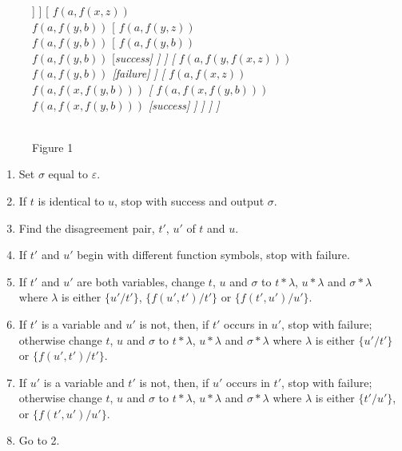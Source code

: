 \documentclass[letterpaper]{report}
\begin{document}
\begin{figure}[h]
\begin{forest}
[
	{$f(x, z)$\\ $f(a, f(y, b))$}
	[
		{$f(a, z)$\\ $f(a, f(y, b))$}
		[
			{$f(a, f(y, b))$\\ $f(a, f(y, b))$}
			[\it success]
		]
	]
	[
		{$f(a, f(x, z))$\\ $f(a, f(y, b))$}
		[
			{$f(a, f(y, z))$\\ $f(a, f(y, b))$}
			[
				{$f(a, f(y, b))$\\ $f(a, f(y, b))$}
				[\it success]
			]
		]
		[
			{$f(a, f(y, f(x, z)))$\\ $f(a, f(y, b))$}
			[\it failure]
		]
		[
			{$f(a, f(x, z))$\\ $f(a, f(x, f(y, b)))$}
			[
				{$f(a, f(x, f(y, b)))$\\ $f(a, f(x, f(y, b)))$}
				[\it success]
			]
		]
	]
]
\end{forest}\\
\small Figure 1
\end{figure}


\begin{enumerate}
	\def\labelenumi{(\arabic{enumi})}
	\item
	Set $\sigma$ equal to $\varepsilon$.
	\item
	If $t$ is identical to $u$, stop with success and output
	$\sigma$.
	\item
	Find the disagreement pair, $t'$, $u'$ of $t$
	and $u$.
	\item
	If $t'$ and $u'$ begin with different function
	symbols, stop with failure.
	\item
	If $t'$ and $u'$ are both variables, change $t$,
	$u$ and $\sigma$ to $t\ast\lambda$, $u\ast\lambda$ and
	$\sigma\ast\lambda$ where $\lambda$ is either
	$\{u'/t'\}$,
	$\{f(u',t')/t'\}$ or
	$\{f(t',u')/u'\}$.
	\item
	If $t'$ is a variable and $u'$ is not, then, if
	$t'$ occurs in $u'$, stop with failure; otherwise
	change $t$, $u$ and $\sigma$ to $t\ast\lambda$, $u\ast\lambda$ and
	$\sigma\ast\lambda$ where $\lambda$ is either
	$\{u'/t'\}$ or
	$\{f(u',t')/t'\}$.
	\item
	If $u'$ is a variable and $t'$ is not, then, if
	$u'$ occurs in $t'$, stop with failure; otherwise
	change $t$, $u$ and $\sigma$ to $t\ast\lambda$, $u\ast\lambda$ and
	$\sigma\ast\lambda$ where $\lambda$ is either
	$\{t'/u'\}$, or
	$\{f(t',u')/u'\}$.
	\item
	Go to 2.
\end{enumerate}
\end{document}
